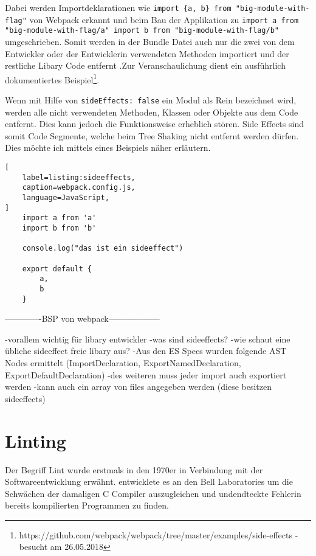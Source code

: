 Dabei werden Importdeklarationen wie \lstinline|import {a, b} from "big-module-with-flag"| von Webpack erkannt und beim Bau der Applikation zu \lstinline|import a from "big-module-with-flag/a" import b from "big-module-with-flag/b"| umgeschrieben. Somit werden in der Bundle Datei auch nur die zwei von dem Entwickler oder der Entwicklerin verwendeten Methoden importiert und der restliche Libary Code entfernt \autocite{WebpackTreeShaking}.Zur Veranschaulichung dient ein ausführlich dokumentiertes Beispiel\footnote{https://github.com/webpack/webpack/tree/master/examples/side-effects - besucht am 26.05.2018}. 

Wenn mit Hilfe von \lstinline{sideEffects: false} ein Modul als Rein bezeichnet wird, werden alle nicht verwendeten Methoden, Klassen oder Objekte aus dem Code entfernt. Dies kann jedoch die Funktionsweise erheblich stören. Side Effects sind somit Code Segmente, welche beim Tree Shaking nicht entfernt werden dürfen. Dies möchte ich mittels eines Beispiels näher erläutern.

\begin{lstlisting}[
    label=listing:sideeffects,
	caption=webpack.config.js,
	language=JavaScript,
]
	import a from 'a'
    import b from 'b'
    
    console.log("das ist ein sideeffect")
    
    export default {
    	a,
        b
    }
\end{lstlisting}





-------------BSP von webpack------------------

-vorallem wichtig für libary entwickler
-was sind sideeffects?
-wie schaut eine übliche sideeffect freie libary aus?
-Aus den ES Specs wurden folgende AST Nodes ermittelt (ImportDeclaration, ExportNamedDeclaration, ExportDefaultDeclaration)
-des weiteren muss jeder import auch exportiert werden
-kann auch ein array von files angegeben werden (diese besitzen sideeffects)

\autocite{TamasSallai}

\section{Linting}
Der Begriff Lint wurde erstmals in den 1970er in Verbindung mit der Softwareentwicklung erwähnt. \textcite{Johnson1978} entwicklete es an den Bell Laboratories um die Schwächen der damaligen C Compiler auszugleichen und undendteckte Fehlerin bereits kompilierten Programmen zu finden.

